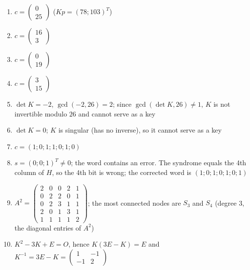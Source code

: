 \begin{enumerate}[label=\arabic*., leftmargin=*, itemsep=1pt]
\item $c=\left(\begin{smallmatrix}0\\25\end{smallmatrix}\right)$ ($Kp=(78;103)^T$)
\item $c=\left(\begin{smallmatrix}16\\3\end{smallmatrix}\right)$
\item $c=\left(\begin{smallmatrix}0\\19\end{smallmatrix}\right)$
\item $c=\left(\begin{smallmatrix}3\\15\end{smallmatrix}\right)$
\item $\det K=-2$, $\gcd(-2,26)=2$; since $\gcd(\det K,26)\ne1$, $K$ is not invertible modulo $26$ and cannot serve as a key
\item $\det K=0$; $K$ is singular (has no inverse), so it cannot serve as a key
\item $c=(1;0;1;1;0;1;0)$
\item $s=(0;0;1)^T\ne0$; the word contains an error. The syndrome equals the 4th column of $H$, so the 4th bit is wrong; the corrected word is $(1;0;1;0;1;0;1)$
\item $A^2=\left(\begin{smallmatrix}2&0&0&2&1\\0&2&2&0&1\\0&2&3&1&1\\2&0&1&3&1\\1&1&1&1&2\end{smallmatrix}\right)$; the most connected nodes are $S_3$ and $S_4$ (degree 3, the diagonal entries of $A^2$)
\item $K^2-3K+E=O$, hence $K(3E-K)=E$ and $K^{-1}=3E-K=\left(\begin{smallmatrix}1&-1\\-1&2\end{smallmatrix}\right)$
\end{enumerate}
